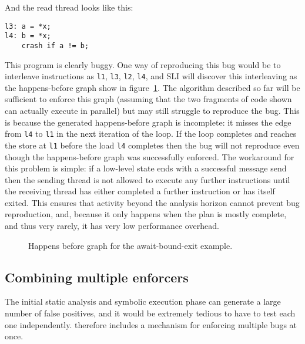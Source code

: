 And the read thread looks like this:

\begin{verbatim}
l3: a = *x;
l4: b = *x;
    crash if a != b;
\end{verbatim}

This program is clearly buggy.  One way of reproducing this bug would
be to interleave instructions as \verb|l1|, \verb|l3|, \verb|l2|,
\verb|l4|, and SLI will discover this interleaving as the
happens-before graph show in figure~\ref{fig:enforce:await_exit_hb}.
The algorithm described so far will be sufficient to enforce this
graph (assuming that the two fragments of code shown can actually
execute in parallel) but may still struggle to reproduce the bug.
This is because the generated happens-before graph is incomplete: it
misses the edge from \verb|l4| to \verb|l1| in the next iteration of
the loop.  If the loop completes and reaches the store at \verb|l1|
before the load \verb|l4| completes then the bug will not reproduce
even though the happens-before graph was successfully enforced.  The
workaround for this problem is simple: if a low-level state ends with
a successful message send then the sending thread is not allowed to
execute any further instructions until the receiving thread has either
completed a further instruction or has itself exited.  This ensures
that activity beyond the analysis horizon cannot prevent bug
reproduction, and, because it only happens when the plan is mostly
complete, and thus very rarely, it has very low performance overhead.

\begin{figure}
\caption{Happens before graph for the await-bound-exit example.}
\label{fig:enforce:await_exit_hb}
\end{figure}

\subsection{Combining multiple enforcers}
\label{sect:enforce:combine_enforcers}

The initial static analysis and symbolic execution phase can generate
a large number of false positives, and it would be extremely tedious
to have to test each one independently.  {\Implementation} therefore
includes a mechanism for enforcing multiple bugs at once.

